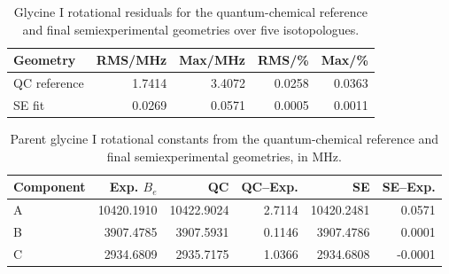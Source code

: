\begin{table}
\caption{Glycine I rotational residuals for the quantum-chemical reference and
final semiexperimental geometries over five isotopologues.}
\label{tab:glycine-I-qc-rotational}
\scriptsize
\setlength{\tabcolsep}{3pt}
\begin{tabular}{lrrrr}
\toprule
Geometry & RMS/MHz & Max/MHz & RMS/\% & Max/\% \\
\midrule
QC reference & 1.7414 & 3.4072 & 0.0258 & 0.0363 \\
SE fit & 0.0269 & 0.0571 & 0.0005 & 0.0011 \\
\bottomrule
\end{tabular}
\end{table}

\begin{table}
\caption{Parent glycine I rotational constants from the quantum-chemical
reference and final semiexperimental geometries, in MHz.}
\label{tab:glycine-I-parent-rotational}
\scriptsize
\setlength{\tabcolsep}{2pt}
\begin{tabular}{lrrrrr}
\toprule
Component & Exp. $B_e$ & QC & QC--Exp. & SE & SE--Exp. \\
\midrule
A & 10420.1910 & 10422.9024 & 2.7114 & 10420.2481 & 0.0571 \\
B & 3907.4785 & 3907.5931 & 0.1146 & 3907.4786 & 0.0001 \\
C & 2934.6809 & 2935.7175 & 1.0366 & 2934.6808 & -0.0001 \\
\bottomrule
\end{tabular}
\end{table}
